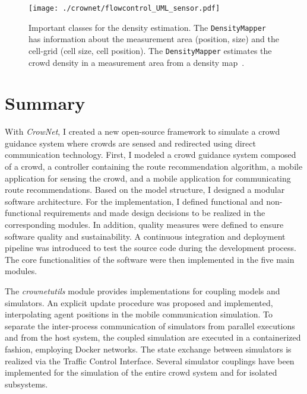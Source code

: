 \begin{figure}[H]
\texttt{[image: ./crownet/flowcontrol\_UML\_sensor.pdf]} 
\caption[Density estimation: implementation of a mapping approach ]{Important classes for the density estimation. The \lstinline{DensityMapper} has information about the measurement area (position, size) and the cell-grid (cell size, cell position). The \lstinline{DensityMapper}  estimates the crowd density in a measurement area from a density map~\cite{schuhbaeck-2023-com}.  }
\label{fig:densitymap}
\end{figure}










\section{Summary}

With \textit{CrowNet}, I created a new open-source framework to simulate a crowd guidance system where crowds are sensed and redirected using direct communication technology. First, I modeled a crowd guidance system composed of a crowd, a controller containing the route recommendation algorithm, a mobile application for sensing the crowd, and a mobile application for communicating route recommendations. Based on the model structure, I designed a modular software architecture. For the implementation, I defined functional and non-functional requirements and made design decisions to be realized in the corresponding modules. In addition, quality measures were defined to ensure software quality and sustainability. A continuous integration and deployment pipeline was introduced to test the source code during the development process. The core functionalities of the software were then implemented in the five main modules.

The \textit{crownetutils} module provides implementations for coupling models and simulators. An explicit update procedure was proposed and implemented, interpolating agent positions in the mobile communication simulation. To separate the inter-process communication of simulators from parallel executions and from the host system, the coupled simulation are executed in a containerized fashion, employing Docker networks. The state exchange between simulators is realized via the Traffic Control Interface. Several simulator couplings have been implemented for the simulation of the entire crowd system and for isolated subsystems. 


